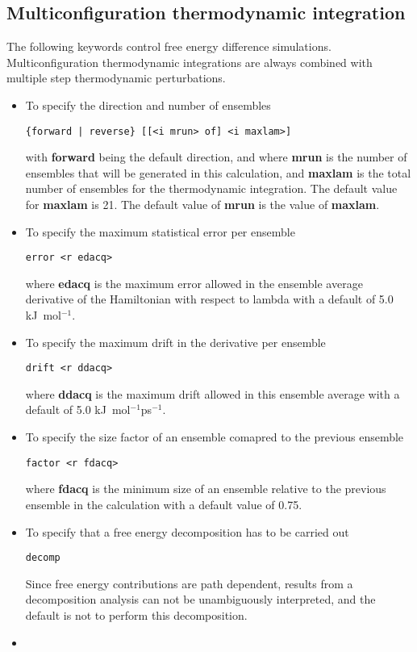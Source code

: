 \subsection{Multiconfiguration thermodynamic integration}
The following keywords control free energy difference simulations.
Multiconfiguration thermodynamic integrations are always combined
with multiple step thermodynamic perturbations.
\begin{itemize}
\item
To specify the direction and number of ensembles
\begin{verbatim}
{forward | reverse} [[<i mrun> of] <i maxlam>]
\end{verbatim}
with {\bf forward} being the default direction, and
where {\bf mrun} is the number of ensembles that will be generated in
this calculation, and {\bf maxlam} is the total number of ensembles
for the thermodynamic integration. The default value for {\bf maxlam}
is 21. The default value of {\bf mrun} is the value of {\bf maxlam}.
\item
To specify the maximum statistical error per ensemble
\begin{verbatim}
error <r edacq>
\end{verbatim}
where {\bf edacq} is the maximum error allowed in the ensemble average 
derivative of the Hamiltonian with respect to lambda with a default
of 5.0 kJ~mol$^{-1}$.
\item
To specify the maximum drift in the derivative per ensemble
\begin{verbatim}
drift <r ddacq>
\end{verbatim}
where {\bf ddacq} is the maximum drift allowed in this
ensemble average with a default of 5.0 kJ~mol$^{-1}$ps$^{-1}$.
\item
To specify the size factor of an ensemble comapred to the previous
ensemble
\begin{verbatim}
factor <r fdacq>
\end{verbatim}
where {\bf fdacq} is the minimum size of an ensemble relative to the
previous ensemble in the calculation with a default value of 0.75.
\item
To specify that a free energy decomposition has to be carried out
\begin{verbatim}
decomp
\end{verbatim}
Since free energy contributions are path dependent, results from a
decomposition analysis can not be unambiguously interpreted, and
the default is not to perform this decomposition.
\item

\end{itemize}
